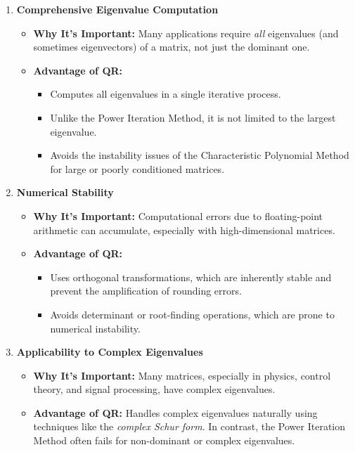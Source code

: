 \documentclass[journal]{IEEEtran}
\begin{document}
\begin{enumerate}
    \item \textbf{Comprehensive Eigenvalue Computation}
    \begin{itemize}
        \item \textbf{Why It's Important:} Many applications require \textit{all} eigenvalues (and sometimes eigenvectors) of a matrix, not just the dominant one.
        \item \textbf{Advantage of QR:}
        \begin{itemize}
            \item Computes all eigenvalues in a single iterative process.
            \item Unlike the Power Iteration Method, it is not limited to the largest eigenvalue.
            \item Avoids the instability issues of the Characteristic Polynomial Method for large or poorly conditioned matrices.
        \end{itemize}
    \end{itemize}
    
    \item \textbf{Numerical Stability}
    \begin{itemize}
        \item \textbf{Why It's Important:} Computational errors due to floating-point arithmetic can accumulate, especially with high-dimensional matrices.
        \item \textbf{Advantage of QR:}
        \begin{itemize}
            \item Uses orthogonal transformations, which are inherently stable and prevent the amplification of rounding errors.
            \item Avoids determinant or root-finding operations, which are prone to numerical instability.
        \end{itemize}
    \end{itemize}
    
    \item \textbf{Applicability to Complex Eigenvalues}
    \begin{itemize}
        \item \textbf{Why It's Important:} Many matrices, especially in physics, control theory, and signal processing, have complex eigenvalues.
        \item \textbf{Advantage of QR:} Handles complex eigenvalues naturally using techniques like the \textit{complex Schur form}. In contrast, the Power Iteration Method often fails for non-dominant or complex eigenvalues.
    \end{itemize}
    

\end{enumerate}
\end{document}
